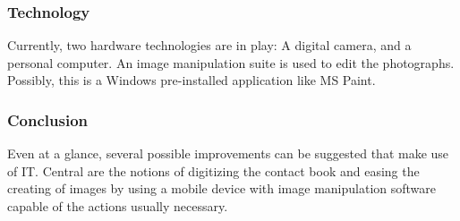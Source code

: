\subsubsection{Technology}
Currently, two hardware technologies are in play: A digital camera, and a personal computer.
An image manipulation suite is used to edit the photographs. Possibly, this is a Windows pre-installed application like MS Paint.

\subsubsection{Conclusion}
Even at a glance, several possible improvements can be suggested that make use of IT. Central are the notions of digitizing the contact book and easing the creating of images by using a mobile device with image manipulation software capable of the actions usually necessary.